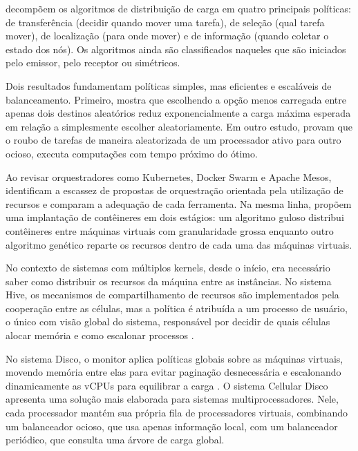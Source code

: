 \citet{shivaratri1992load} decompõem os algoritmos de distribuição de carga em quatro principais políticas: de transferência (decidir
quando mover uma tarefa), de seleção (qual tarefa mover), de localização (para onde mover) e de informação (quando coletar o estado dos nós).
Os algoritmos ainda são classificados naqueles que são iniciados pelo emissor, pelo receptor ou simétricos.

Dois resultados fundamentam políticas simples, mas eficientes e escaláveis de balanceamento.
Primeiro, \citet{mitzenmacher2001power} mostra que escolhendo a opção menos carregada entre apenas dois destinos aleatórios
reduz exponencialmente a carga máxima esperada em relação a simplesmente escolher aleatoriamente.
Em outro estudo, \citet{blumofe1999work} provam que o roubo de tarefas de maneira aleatorizada de um processador ativo para outro ocioso, executa computações
com tempo próximo do ótimo.

Ao revisar orquestradores como Kubernetes, Docker Swarm e Apache Mesos, \citet{swetha2025resource} identificam a escassez
de propostas de orquestração orientada pela utilização de recursos e comparam a adequação de cada ferramenta.
Na mesma linha, \citet{lu2025optimized} propõem uma implantação de contêineres em dois estágios: um algoritmo guloso distribui contêineres
entre máquinas virtuais com granularidade grossa enquanto outro algoritmo genético reparte os recursos dentro de cada uma das máquinas virtuais.

No contexto de sistemas com múltiplos kernels, desde o início, era necessário saber como distribuir os recursos da máquina entre as instâncias.
No sistema Hive, os mecanismos de compartilhamento de recursos são implementados pela cooperação entre as células, mas a política
é atribuída a um processo de usuário, o único com visão global do sistema, responsável por decidir de
quais células alocar memória e como escalonar processos \citep{chapin1995hive}.

No sistema Disco, o monitor aplica políticas globais sobre as máquinas virtuais, movendo memória entre elas para evitar paginação
desnecessária e escalonando dinamicamente as vCPUs para equilibrar a carga \citep{bugnion1997disco}.
O sistema Cellular Disco \citep{govil2000cellular} apresenta uma solução mais elaborada para sistemas multiprocessadores.
Nele, cada processador mantém sua própria fila de processadores virtuais, combinando um
balanceador ocioso, que usa apenas informação local, com um balanceador periódico, que consulta uma árvore de carga global.

